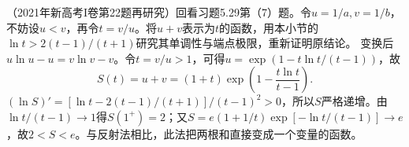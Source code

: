 （2021年新高考I卷第22题再研究）回看习题5.29第（7）题。令\(u=1/a,v=1/b\)，不妨设\(u<v\)，再令\(t=v/u\)。将\(u+v\)表示为\(t\)的函数，用本小节的\(\ln t>2(t-1)/(t+1)\)研究其单调性与端点极限，重新证明原结论。
\solutionanswer
变换后\(u\ln u-u=v\ln v-v\)。令\(t=v/u>1\)，可得\(u=\exp(1-t\ln t/(t-1))\)，故
\[
 S(t)=u+v=(1+t)\exp\left(1-\frac{t\ln t}{t-1}\right).
\]
\((\ln S)'=[\ln t-2(t-1)/(t+1)]/(t-1)^2>0\)，所以\(S\)严格递增。由\(\ln t/(t-1)\to1\)得\(S(1^+)=2\)；又\(S=e(1+1/t)\exp[-\ln t/(t-1)]\to e\)，故\(2<S<e\)。与反射法相比，此法把两根和直接变成一个变量的函数。
\par
